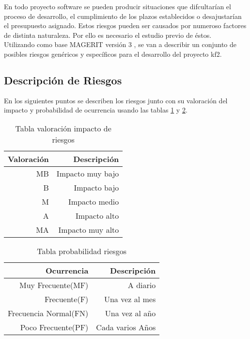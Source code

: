 En todo proyecto \gls{software} se pueden producir situaciones que difcultarían el proceso de desarrollo, el cumplimiento de los plazos establecidos o desajustarían el presupuesto asignado. Estos riesgos pueden ser causados por numeroso factores de distinta naturaleza. Por ello es necesario el estudio previo de éstos.\\

Utilizando como base MAGERIT versión 3 \cite{MAGERIT}, se van a describir un conjunto de posibles riesgos genéricos y específicos para el desarrollo del proyecto \gls{kf2}.\\

\subsection{Descripción de Riesgos}
En los siguientes puntos se describen los riesgos junto con su valoración del impacto y probabilidad de ocurrencia usando las tablas \ref{table:valoracion} y \ref{table:probabilidad}.

\begin{center}
\begin {table}[H]
\centering
    \begin{tabular}{ | r | r |}
    \hline
\textbf{Valoración} & \textbf{Descripción}  \\ \hline
MB &  Impacto muy bajo \\ \hline
B & Impacto bajo \\ \hline
M & Impacto medio\\ \hline
A & Impacto alto \\ \hline
MA & Impacto muy alto \\ \hline
    \end{tabular}
	\caption{Tabla valoración impacto de riesgos}
    \label{table:valoracion}
  \end{table}
\end{center}

\begin{center}
\begin {table}[H]
\centering
    \begin{tabular}{ | r | r |}
    \hline
\textbf{Ocurrencia} & \textbf{Descripción} \\ \hline
Muy Frecuente(MF) & A diario \\ \hline
Frecuente(F) & Una vez al mes \\ \hline
Frecuencia Normal(FN) & Una vez al año \\ \hline
Poco Frecuente(PF) & Cada varios Años \\ \hline
    \end{tabular}
	\caption{Tabla probabilidad riesgos}
    \label{table:probabilidad}
  \end{table}
\end{center}



